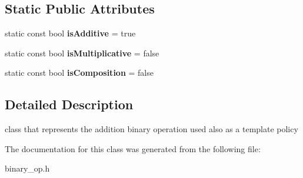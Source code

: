 \subsection*{Static Public Attributes}
\begin{DoxyCompactItemize}
\item 
\hypertarget{classAddition_a24b52cf787fbb2997cca7fabd26feb9b}{static const bool {\bfseries is\-Additive} = true}\label{classAddition_a24b52cf787fbb2997cca7fabd26feb9b}

\item 
\hypertarget{classAddition_a5e060aac1855b53aa87849ea9e439cd9}{static const bool {\bfseries is\-Multiplicative} = false}\label{classAddition_a5e060aac1855b53aa87849ea9e439cd9}

\item 
\hypertarget{classAddition_a7fce2d48cdd7335298e138775b9fde7b}{static const bool {\bfseries is\-Composition} = false}\label{classAddition_a7fce2d48cdd7335298e138775b9fde7b}

\end{DoxyCompactItemize}


\subsection{Detailed Description}
class that represents the addition binary operation used also as a template policy 

The documentation for this class was generated from the following file\-:\begin{DoxyCompactItemize}
\item 
binary\-\_\-op.\-h\end{DoxyCompactItemize}
